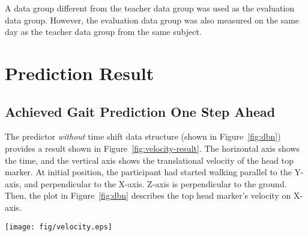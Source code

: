 \documentclass{sigchi}
\begin{document}
A data group different from the teacher data group was used as the evaluation data group. However, the evaluation data group was also measured on the same day as the teacher data group from the same subject.


\section{Prediction Result}%

\subsection {Achieved Gait Prediction One Step Ahead}

The predictor \textit{without} time shift data structure (shown in Figure~\ref{fig:dbn}) provides a result shown in Figure~\ref{fig:velocity-result}. The horizontal axis shows the time, and the vertical axis shows the translational velocity of the head top marker. At initial position, the participant had started walking parallel to the Y-axis, and perpendicular to the X-axis. Z-axis is perpendicular to the ground. Then, the plot in Figure~\ref{fig:dbn} describes the top head marker's velocity on X-axis. 

\begin{figure*} 
\centering
  \texttt{[image: fig/velocity.eps]}\hspace{-15mm} 
  \caption{$ x $ speed prediction result in the axial direction ($ \Delta t $ represents the preceding time width)}~\label{fig:velocity-result}
\end{figure*}
\end{document}
